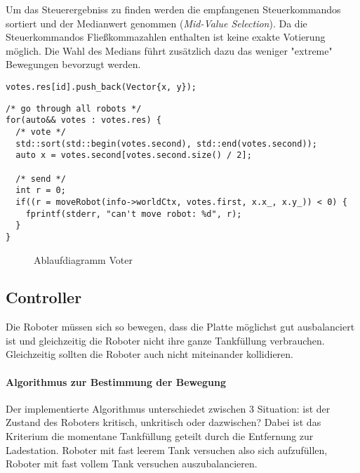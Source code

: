{Um das Steuerergebniss zu finden werden die empfangenen Steuerkommandos sortiert und der Medianwert genommen (\textit{Mid-Value Selection}). Da die Steuerkommandos
Flie{\ss}kommazahlen enthalten ist keine exakte Votierung m{\"{o}}glich. Die Wahl des Medians f{\"{u}}hrt zus{\"{a}}tzlich dazu das weniger "extreme" Bewegungen bevorzugt werden.
\noindent\begin{minipage}{.30\textwidth}
	\begin{lstlisting}[caption=Sammeln, frame=tlrb, language={[11]C++}]
votes.res[id].push_back(Vector{x, y});
\end{lstlisting}
\end{minipage}\hfill
\begin{minipage}{.60\textwidth}
\begin{lstlisting}[caption=Auswahl, frame=tlrb, language={[11]C++}]
/* go through all robots */
for(auto&& votes : votes.res) {
  /* vote */
  std::sort(std::begin(votes.second), std::end(votes.second));
  auto x = votes.second[votes.second.size() / 2];

  /* send */
  int r = 0;
  if((r = moveRobot(info->worldCtx, votes.first, x.x_, x.y_)) < 0) {
  	fprintf(stderr, "can't move robot: %d", r);
  }
}
\end{lstlisting}
\end{minipage}


\begin{figure}
	\centering
	\caption{Ablaufdiagramm Voter}
	\label{fig:sequence-voter}
\end{figure}
\clearpage %

\subsection{Controller}\label{controller}
Die Roboter m{\"{u}}ssen sich so bewegen, dass die Platte m{\"{o}}glichst gut ausbalanciert
ist und gleichzeitig die Roboter nicht ihre ganze Tankf{\"{u}}llung verbrauchen. Gleichzeitig sollten die Roboter auch nicht miteinander
kollidieren.

\paragraph{Algorithmus zur Bestimmung der Bewegung} Der implementierte Algorithmus unterschiedet zwischen 3 Situation: ist der Zustand des Roboters kritisch,
unkritisch oder dazwischen? Dabei ist das Kriterium die momentane Tankf{\"{u}}llung geteilt durch die Entfernung zur Ladestation. Roboter mit fast leerem Tank
versuchen also sich aufzuf{\"{u}}llen, Roboter mit fast vollem Tank versuchen auszubalancieren.

}

